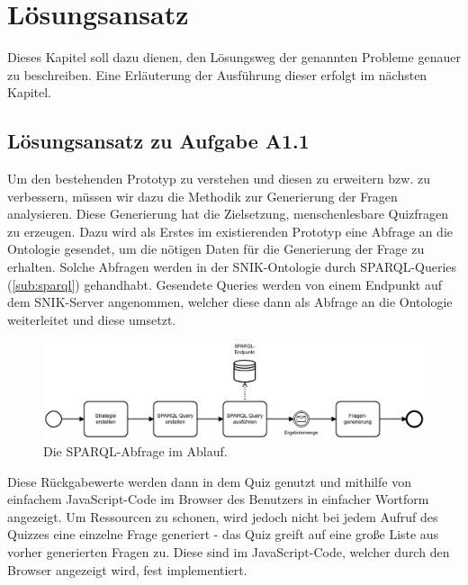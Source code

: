 \documentclass[headsepline,titlepage,ngerman,twoside,12pt]{report}
\newcommand\todo[1]{}%
\begin{document}
\chapter{Lösungsansatz}
\label{ch:Lösungsansatz}
\todo{Der Lösungsansatz ist eine kurze Beschreibung der Arbeitshypothese sowie des Vorgehens zur Lösung der in der Einleitung beschriebenen Probleme.}
Dieses Kapitel soll dazu dienen, den Lösungsweg der genannten Probleme genauer zu beschreiben.
Eine Erläuterung der Ausführung dieser erfolgt im nächsten Kapitel. 

\section{Lösungsansatz zu Aufgabe A1.1}
Um den bestehenden Prototyp zu verstehen und diesen zu erweitern bzw. zu verbessern, müssen wir dazu die Methodik zur Generierung der Fragen analysieren.
Diese Generierung hat die Zielsetzung, menschenlesbare Quizfragen zu erzeugen.
Dazu wird als Erstes im existierenden Prototyp eine Abfrage an die Ontologie gesendet, um die nötigen Daten für die Generierung der Frage zu erhalten.
Solche Abfragen werden in der SNIK-Ontologie durch SPARQL-Queries (\cref{sub:sparql}) gehandhabt. Gesendete Queries werden von einem Endpunkt auf dem SNIK-Server angenommen, welcher diese dann als Abfrage an die Ontologie weiterleitet und diese umsetzt.
\begin{figure}
\centering
\includegraphics[width=\textwidth]{images/sparql-gen.pdf}
\caption{Die SPARQL-Abfrage im Ablauf.}
\label{img:sparql-question-generation}
\end{figure}
Diese Rückgabewerte werden dann in dem Quiz genutzt und mithilfe von einfachem JavaScript-Code im Browser des Benutzers in einfacher Wortform angezeigt. Um Ressourcen zu schonen, wird jedoch nicht bei jedem Aufruf des Quizzes eine einzelne Frage generiert - das Quiz greift auf eine große Liste aus vorher generierten Fragen zu.
Diese sind im JavaScript-Code, welcher durch den Browser angezeigt wird, fest implementiert.\\

\end{document}
